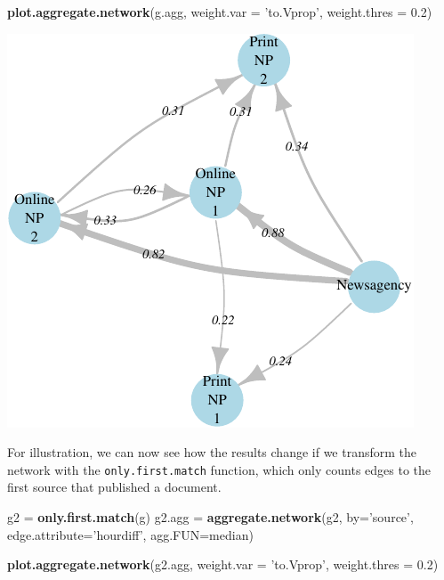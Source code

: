 \documentclass[]{article}
\newenvironment{Shaded}{\begin{snugshade}}{\end{snugshade}}
\newcommand{\KeywordTok}[1]{\textcolor[rgb]{0.13,0.29,0.53}{\textbf{{#1}}}}
\newcommand{\DataTypeTok}[1]{\textcolor[rgb]{0.13,0.29,0.53}{{#1}}}
\newcommand{\FloatTok}[1]{\textcolor[rgb]{0.00,0.00,0.81}{{#1}}}
\newcommand{\StringTok}[1]{\textcolor[rgb]{0.31,0.60,0.02}{{#1}}}
\newcommand{\NormalTok}[1]{{#1}}
\begin{document}
\begin{Shaded}
\begin{Highlighting}[]
\KeywordTok{plot.aggregate.network}\NormalTok{(g.agg, }\DataTypeTok{weight.var =} \StringTok{'to.Vprop'}\NormalTok{,}
                       \DataTypeTok{weight.thres =} \FloatTok{0.2}\NormalTok{)}
\end{Highlighting}
\end{Shaded}

\begin{center}\includegraphics{vignette_files/figure-latex/unnamed-chunk-20-1} \end{center}

For illustration, we can now see how the results change if we transform
the network with the \texttt{only.first.match} function, which only
counts edges to the first source that published a document.

\begin{Shaded}
\begin{Highlighting}[]
\NormalTok{g2 =}\StringTok{ }\KeywordTok{only.first.match}\NormalTok{(g)}
\NormalTok{g2.agg =}\StringTok{ }\KeywordTok{aggregate.network}\NormalTok{(g2, }\DataTypeTok{by=}\StringTok{'source'}\NormalTok{, }\DataTypeTok{edge.attribute=}\StringTok{'hourdiff'}\NormalTok{, }\DataTypeTok{agg.FUN=}\NormalTok{median)}

\KeywordTok{plot.aggregate.network}\NormalTok{(g2.agg, }\DataTypeTok{weight.var =} \StringTok{'to.Vprop'}\NormalTok{,}
                       \DataTypeTok{weight.thres =} \FloatTok{0.2}\NormalTok{)}
\end{Highlighting}
\end{Shaded}
\end{document}
